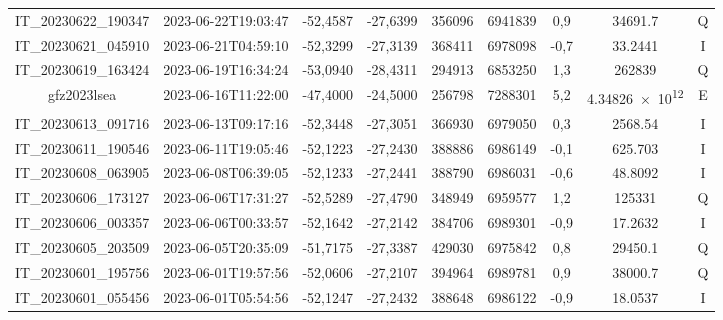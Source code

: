 \begin{table}[htb!]
\begin{tabular}{ccccS[table-format=6.0]S[table-format=7.0]ccc}
            IT\_20230622\_190347 & 2023-06-22T19:03:47 & -52,4587 & -27,6399 & 356096 & 6941839 & 0,9 & \num[round-precision=3,round-mode=figures,scientific-notation=true]{34691.7} & Q \\
            IT\_20230621\_045910 & 2023-06-21T04:59:10 & -52,3299 & -27,3139 & 368411 & 6978098 & -0,7 & \num[round-precision=3,round-mode=figures,scientific-notation=true]{33.2441} & I \\
            IT\_20230619\_163424 & 2023-06-19T16:34:24 & -53,0940 & -28,4311 & 294913 & 6853250 & 1,3 & \num[round-precision=3,round-mode=figures,scientific-notation=true]{262839} & Q \\
            gfz2023lsea & 2023-06-16T11:22:00 & -47,4000 & -24,5000 & 256798 & 7288301 & 5,2 & \num[round-precision=3,round-mode=figures,scientific-notation=true]{4.34826e+12} & E \\
            IT\_20230613\_091716 & 2023-06-13T09:17:16 & -52,3448 & -27,3051 & 366930 & 6979050 & 0,3 & \num[round-precision=3,round-mode=figures,scientific-notation=true]{2568.54} & I \\
            IT\_20230611\_190546 & 2023-06-11T19:05:46 & -52,1223 & -27,2430 & 388886 & 6986149 & -0,1 & \num[round-precision=3,round-mode=figures,scientific-notation=true]{625.703} & I \\
            IT\_20230608\_063905 & 2023-06-08T06:39:05 & -52,1233 & -27,2441 & 388790 & 6986031 & -0,6 & \num[round-precision=3,round-mode=figures,scientific-notation=true]{48.8092} & I \\
            IT\_20230606\_173127 & 2023-06-06T17:31:27 & -52,5289 & -27,4790 & 348949 & 6959577 & 1,2 & \num[round-precision=3,round-mode=figures,scientific-notation=true]{125331} & Q \\
            IT\_20230606\_003357 & 2023-06-06T00:33:57 & -52,1642 & -27,2142 & 384706 & 6989301 & -0,9 & \num[round-precision=3,round-mode=figures,scientific-notation=true]{17.2632} & I \\
            IT\_20230605\_203509 & 2023-06-05T20:35:09 & -51,7175 & -27,3387 & 429030 & 6975842 & 0,8 & \num[round-precision=3,round-mode=figures,scientific-notation=true]{29450.1} & Q \\
            IT\_20230601\_195756 & 2023-06-01T19:57:56 & -52,0606 & -27,2107 & 394964 & 6989781 & 0,9 & \num[round-precision=3,round-mode=figures,scientific-notation=true]{38000.7} & Q \\
            IT\_20230601\_055456 & 2023-06-01T05:54:56 & -52,1247 & -27,2432 & 388648 & 6986122 & -0,9 & \num[round-precision=3,round-mode=figures,scientific-notation=true]{18.0537} & I \\

\end{tabular}
\end{table}
